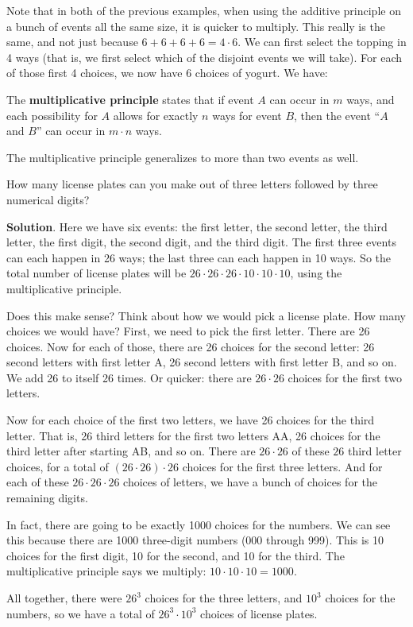\documentclass[11pt,]{book}
\newcommand{\terminology}[1]{\textbf{#1}}
\theoremstyle{ptxplainnotitle}
\theoremstyle{ptxplaintitle}
\theoremstyle{ptxdefinitionnotitle}
\theoremstyle{ptxdefinitiontitle}
\theoremstyle{ptxdefinitionnotitle}
\theoremstyle{ptxdefinitiontitle}
\theoremstyle{ptxdefinitionnotitle}
\theoremstyle{ptxdefinitiontitle}
\theoremstyle{ptxdefinitiontitlenonumber}
\theoremstyle{ptxdefinitiontitlenonumber}
\numberwithin{equation}{chapter}
\begin{document}
\hypertarget{p-974}{}%
Note that in both of the previous examples, when using the additive principle on a bunch of events all the same size, it is quicker to multiply. This really is the same, and not just because \(6 + 6 + 6 + 6 = 4\cdot 6\). We can first select the topping in 4 ways (that is, we first select which of the disjoint events we will take). For each of those first 4 choices, we now have 6 choices of yogurt. We have:%
\begin{assemblage}\label{assemblage-12}
\hypertarget{p-975}{}%
The \terminology{multiplicative principle} states that if event \(A\) can occur in \(m\) ways, and each possibility for \(A\) allows for exactly \(n\) ways for event \(B\), then the event ``\(A\) and \(B\)'' can occur in \(m \cdot n\) ways.%
\end{assemblage}
\hypertarget{p-976}{}%
The multiplicative principle generalizes to more than two events as well.%
\begin{example}\label{example-37}
\hypertarget{p-977}{}%
How many license plates can you make out of three letters followed by three numerical digits?%
\par\smallskip%
\noindent\textbf{Solution}.\hypertarget{solution-127}{}\quad%
\hypertarget{p-978}{}%
Here we have six events: the first letter, the second letter, the third letter, the first digit, the second digit, and the third digit. The first three events can each happen in 26 ways; the last three can each happen in 10 ways. So the total number of license plates will be \(26\cdot 26\cdot 26 \cdot 10 \cdot 10 \cdot 10\), using the multiplicative principle.%
\par
\hypertarget{p-979}{}%
Does this make sense? Think about how we would pick a license plate. How many choices we would have? First, we need to pick the first letter. There are 26 choices. Now for each of those, there are 26 choices for the second letter: 26 second letters with first letter A, 26 second letters with first letter B, and so on. We add 26 to itself 26 times. Or quicker: there are \(26 \cdot 26\) choices for the first two letters.%
\par
\hypertarget{p-980}{}%
Now for each choice of the first two letters, we have 26 choices for the third letter. That is, 26 third letters for the first two letters AA, 26 choices for the third letter after starting AB, and so on. There are \(26 \cdot 26\) of these \(26\) third letter choices, for a total of \((26\cdot26)\cdot 26\) choices for the first three letters. And for each of these \(26\cdot26\cdot26\) choices of letters, we have a bunch of choices for the remaining digits.%
\par
\hypertarget{p-981}{}%
In fact, there are going to be exactly 1000 choices for the numbers. We can see this because there are 1000 three-digit numbers (000 through 999). This is 10 choices for the first digit, 10 for the second, and 10 for the third. The multiplicative principle says we multiply: \(10\cdot 10 \cdot 10 = 1000\).%
\par
\hypertarget{p-982}{}%
All together, there were \(26^3\) choices for the three letters, and \(10^3\) choices for the numbers, so we have a total of \(26^3 \cdot 10^3\) choices of license plates.%
\end{example}
\end{document}
